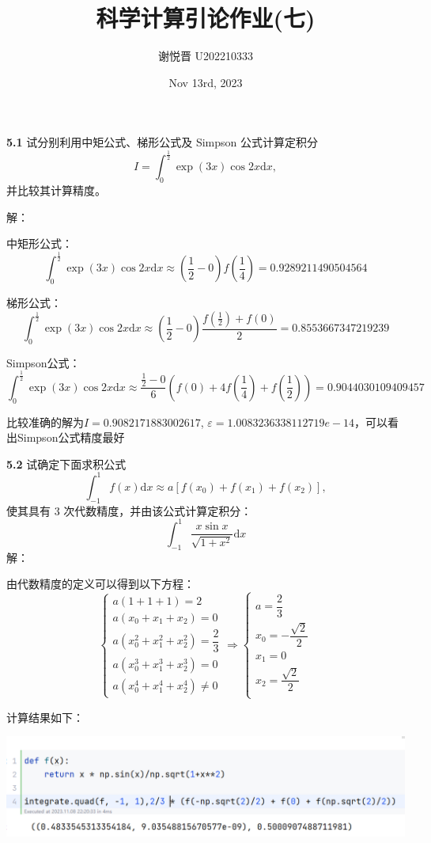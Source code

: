 \documentclass[a4paper,11pt,UTF8]{bitbook}
\title{科学计算引论作业(七)}
\author{谢悦晋 \quad U202210333}
\date{Nov 13rd, 2023 }
\begin{document}
\maketitle
\textbf{5.1} 试分别利用中矩公式、梯形公式及 Simpson 公式计算定积分
$$
I=\int_0^{\frac12}\exp(3x)\cos2x\mathrm{d}x,
$$
并比较其计算精度。

\noindent 解：

中矩形公式：
$$
	\int_{0}^{\frac{1}{2}}\exp(3x)\cos 2x\mathrm{d}x\approx(\frac12-0)f(\frac14)=0.9289211490504564
$$

梯形公式：
$$
\int_{0}^{\frac{1}{2}}\exp(3x)\cos 2x\mathrm{d}x\approx(\frac12-0)\frac{f(\frac12)+f(0)}{2}=0.8553667347219239
$$

Simpson公式：
$$
\int_{0}^{\frac{1}{2}}\exp(3x)\cos 2x\mathrm{d}x\approx\frac{\frac12-0}{6}(f(0)+4f(\frac14)+f(\frac12))=0.9044030109409457
$$

比较准确的解为$I=0.9082171883002617$, $\varepsilon=1.0083236338112719e-14$，可以看出Simpson公式精度最好

\textbf{5.2} 试确定下面求积公式
$$
\int_{-1}^1f(x)\mathrm{d}x\approx a[f(x_0)+f(x_1)+f(x_2)],
$$
使其具有 3 次代数精度，并由该公式计算定积分：
$$
	\int_{-1}^1\frac{x\sin x}{\sqrt{1+x^2}}\mathrm{d}x
$$
\noindent 解：

由代数精度的定义可以得到以下方程：
$$
\begin{cases}
	 a(1+1+1)=2\\
	 a(x_0+x_1+x_2)=0\\
	 a(x_0^2+x_1^2+x_2^2)=\dfrac{2}{3}\\
	 a(x_0^3+x_1^3+x_2^3)=0\\
	 a(x_0^4+x_1^4+x_2^4)\neq0
\end{cases}\Rightarrow
\begin{cases}
	a=\dfrac{2}{3}\\
	x_0=-\dfrac{\sqrt{2}}{2}\\
	x_1=0\\
	x_2=\dfrac{\sqrt{2}}{2}\\
\end{cases}
$$

计算结果如下：

\includegraphics[width=1\textwidth]{5.2_1}
\end{document}
